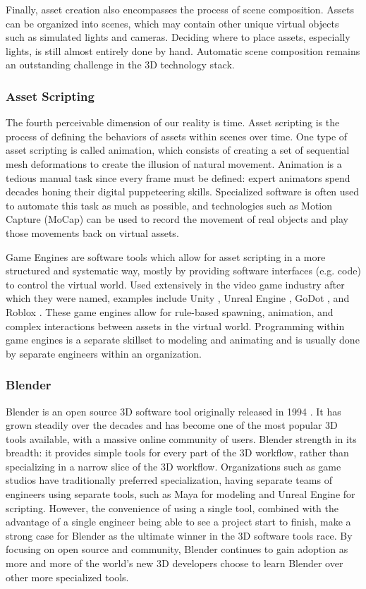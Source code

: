 \documentclass{article}
\begin{document}
Finally, asset creation also encompasses the process of scene composition. Assets can be organized into scenes, which may contain other unique virtual objects such as simulated lights and cameras. Deciding where to place assets, especially lights, is still almost entirely done by hand. Automatic scene composition remains an outstanding challenge in the 3D technology stack.


\subsubsection{Asset Scripting}
\label{sec:assetscripting}

The fourth perceivable dimension of our reality is time. Asset scripting is the process of defining the behaviors of assets within scenes over time. One type of asset scripting is called animation, which consists of creating a set of sequential mesh deformations to create the illusion of natural movement. Animation is a tedious manual task since every frame must be defined: expert animators spend decades honing their digital puppeteering skills. Specialized software is often used to automate this task as much as possible, and technologies such as Motion Capture (MoCap) can be used to record the movement of real objects and play those movements back on virtual assets.

Game Engines are software tools which allow for asset scripting in a more structured and systematic way, mostly by providing software interfaces (e.g. code) to control the virtual world. Used extensively in the video game industry after which they were named, examples include Unity \citep{unity3d}, Unreal Engine \citep{unrealengine}, GoDot \citep{godot}, and Roblox \citep{roblox}. These game engines allow for rule-based spawning, animation, and complex interactions between assets in the virtual world. Programming within game engines is a separate skillset to modeling and animating and is usually done by separate engineers within an organization.

\subsubsection{Blender}
\label{sec:blender}

Blender is an open source 3D software tool originally released in 1994 \citep{blender}. It has grown steadily over the decades and has become one of the most popular 3D tools available, with a massive online community of users. Blender strength in its breadth: it provides simple tools for every part of the 3D workflow, rather than specializing in a narrow slice of the 3D workflow. Organizations such as game studios have traditionally preferred specialization, having separate teams of engineers using separate tools, such as Maya for modeling and Unreal Engine for scripting. However, the convenience of using a single tool, combined with the advantage of a single engineer being able to see a project start to finish, make a strong case for Blender as the ultimate winner in the 3D software tools race. By focusing on open source and community, Blender continues to gain adoption as more and more of the world’s new 3D developers choose to learn Blender over other more specialized tools.
\end{document}
